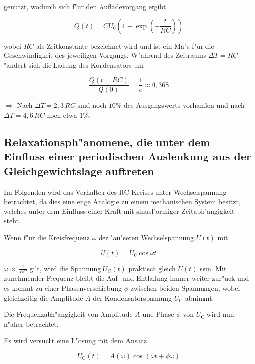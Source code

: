 \documentclass{scrartcl}
\begin{document}
				genutzt, wodurch sich f"ur den Aufladevorgang ergibt

				\begin{equation}
					Q(t) = C U_\mathrm{0} \left( 1 - \exp{ \left( -\frac{t}{RC} \right) } \right) \label{11}
				\end{equation}

				wobei $RC$ als Zeitkonstante bezeichnet wird und ist ein Ma"s f"ur die Geschwindigkeit des jeweiligen Vorgangs. W"ahrend des Zeitraums 
				$\Delta T = RC$ "andert sich die Ladung des Kondensators um

				\begin{equation}
					\frac{Q(t = RC)}{Q(0)} = \frac{1}{e} \approx 0,368 \label{11}
				\end{equation}

				$\Rightarrow$ Nach $\Delta T = 2,3 \, RC$ sind noch $10 \%$ des Ausgangswerts vorhanden und nach $\Delta T = 4,6 \, RC$ noch etwa $1 \%$.

		\newpage
		\subsection{Relaxationsph"anomene, die unter dem Einfluss einer periodischen Auslenkung aus der Gleichgewichtslage auftreten}

			Im Folgenden wird das Verhalten des RC-Kreises unter Wechselspannung betrachtet, da dies eine enge Analogie zu einem mechanischen System besitzt, welches unter dem Einfluss einer Kraft mit sinusf"ormiger Zeitabh"angigkeit steht.

			Wenn f"ur die Kreisfrequenz $\omega$ der "au"seren Wechselspannung $U(t)$ mit
			
			\begin{equation}
				U(t) = U_\mathrm{0} \cos{\omega t} \label{12}
			\end{equation}

			$\omega \ll \frac{1}{RC}$ gilt, wird die Spannung $U_{\mathrm{C}}(t)$ praktisch gleich $U(t)$ sein. Mit zunehmender Frequenz bleibt die Auf- und Entladung immer weiter zur"uck und es kommt zu einer Phasenverschiebung $\phi$ zwischen beiden Spannungen, wobei gleichzeitig die Amplitude $A$ der Kondensatorspannung $U_{\mathrm{C}}$ abnimmt.

			Die Frequenzabh"angigkeit von Amplitude $A$ und Phase $\phi$ von $U_{\mathrm{C}}$ wird nun n"aher betrachtet.


			Es wird versucht eine L"osung mit dem Ansatz

			\begin{equation}
				U_{\mathrm{C}}(t) = A(\omega) \cos(\omega t + \phi {\omega}) \label{13}
			\end{equation}
\end{document}
